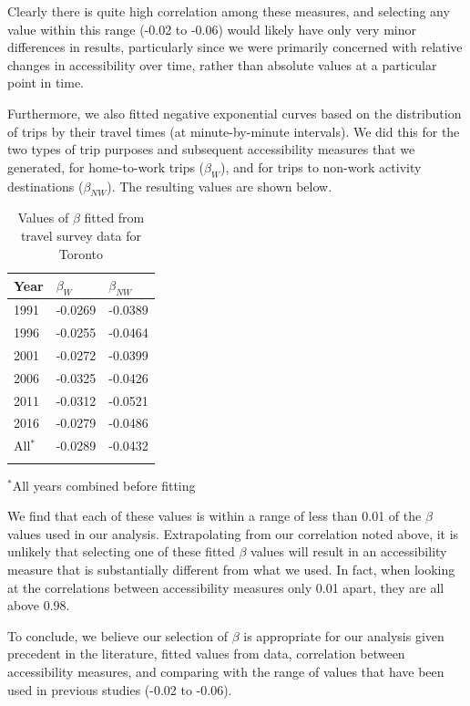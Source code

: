 Clearly there is quite high correlation among these measures, and selecting any value within this range (-0.02 to -0.06) would likely have only very minor differences in results, particularly since we were primarily concerned with relative changes in accessibility over time, rather than absolute values at a particular point in time. 

Furthermore, we also fitted negative exponential curves based on the distribution of trips by their travel times (at minute-by-minute intervals). We did this for the two types of trip purposes and subsequent accessibility measures that we generated, for home-to-work trips ($\beta_W$), and for trips to non-work activity destinations ($\beta_{NW}$). The resulting values are shown below.

\begin{table}[h]
	\vspace{2mm}
	\small
	\centering
	\caption{Values of $\beta$ fitted from travel survey data for Toronto}
	\label{table:beta_fit}
	\begin{tabular}{lll}
		\hline
		Year & $\beta_{W}$ & $\beta_{NW}$ \\ \hline
		1991 & -0.0269   & -0.0389       \\
		1996 & -0.0255   & -0.0464       \\
		2001 & -0.0272   & -0.0399       \\
		2006 & -0.0325   & -0.0426       \\
		2011 & -0.0312   & -0.0521       \\
		2016 & -0.0279   & -0.0486       \\
		All$^*$  & -0.0289   & -0.0432      \\ \hline \\
	\end{tabular}
	
	$^*$All years combined before fitting
\end{table}

We find that each of these values is within a range of less than 0.01 of the $\beta$ values used in our analysis. Extrapolating from our correlation noted above, it is unlikely that selecting one of these fitted $\beta$ values will result in an accessibility measure that is substantially different from what we used. In fact, when looking at the correlations between accessibility measures only 0.01 apart, they are all above 0.98.

To conclude, we believe our selection of $\beta$ is appropriate for our analysis given precedent in the literature, fitted values from data, correlation between accessibility measures, and comparing with the range of values that have been used in previous studies (-0.02 to -0.06). 

